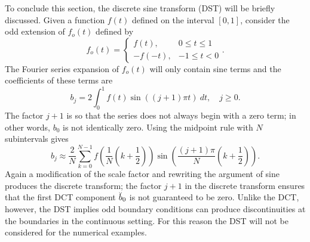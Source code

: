 To conclude this section, the discrete sine transform (DST) will be briefly discussed. Given a function $f(t)$ defined on the interval $[0,1]$, consider the odd extension of $f_o(t)$ defined by
\[f_o(t) = \begin{cases}
f(t), & 0 \leq t \leq 1 \\
-f(-t), & -1 \leq t < 0
\end{cases}.\]
The Fourier series expansion of $f_o(t)$ will only contain sine terms and the coefficients of these terms are
\[b_j = 2\int_0^1 f(t) \sin((j+1)\pi{t})~dt, \quad j \geq 0.\]
The factor $j+1$ is so that the series does not always begin with a zero term; in other words, $b_0$ is not identically zero. Using the midpoint rule with $N$ subintervals gives
\[b_j \approx \frac{2}{N}\sum_{k=0}^{N-1} f\left(\frac{1}{N}\left(k+\frac{1}{2}\right)\right)\sin\left(\frac{(j+1)\pi}{N}\left(k+\frac{1}{2}\right)\right).\]
Again a modification of the scale factor and rewriting the argument of sine produces the discrete transform; the factor $j+1$ in the discrete transform ensures that the first DCT component $\breve{b}_0$ is not guaranteed to be zero. Unlike the DCT, however, the DST implies odd boundary conditions can produce discontinuities at the boundaries in the continuous setting. For this reason the DST will not be considered for the numerical examples.


